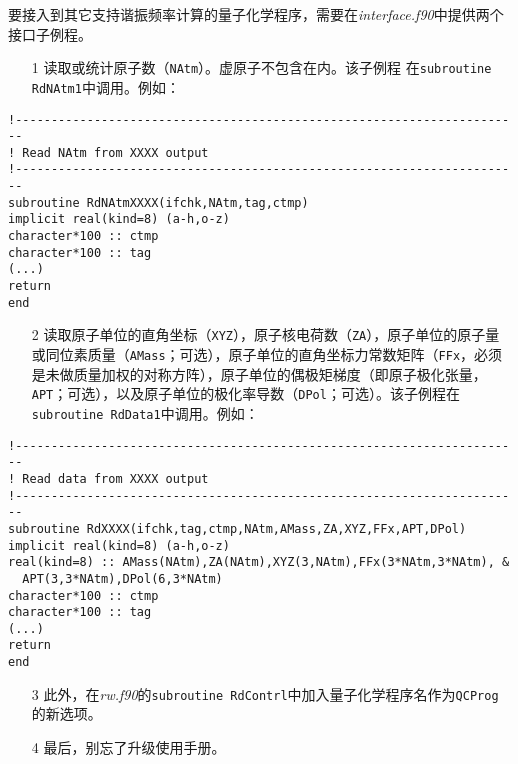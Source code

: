 \documentclass[12pt,a4paper,openany,twoside,cap,UTF8]{ctexbook}
\begin{document}
要接入到其它支持谐振频率计算的量子化学程序，需要在\emph{interface.f90}中提供两个接口子例程。
\begin{enumerate}
\item[1] 读取或统计原子数（\verb|NAtm|）。虚原子不包含在内。该子例程 在\verb|subroutine RdNAtm1|中调用。例如：
\end{enumerate}
\begin{colorboxed}[oval=false,boxcolor=blue!75!black,bgcolor=blue!5!white]
\begin{lstlisting}[language={[90]Fortran}]
!-----------------------------------------------------------------------
! Read NAtm from XXXX output
!-----------------------------------------------------------------------
subroutine RdNAtmXXXX(ifchk,NAtm,tag,ctmp)
implicit real(kind=8) (a-h,o-z)
character*100 :: ctmp
character*100 :: tag
(...)
return
end
\end{lstlisting}\end{colorboxed}
\begin{enumerate}
\item[2] 读取原子单位的直角坐标（\verb|XYZ|），原子核电荷数（\verb|ZA|），原子单位的原子量或同位素质量（\verb|AMass|；可选），原子单位的直角坐标力常数矩阵（\verb|FFx|，必须是未做质量加权的对称方阵），原子单位的偶极矩梯度（即原子极化张量，\verb|APT|；可选），以及原子单位的极化率导数（\verb|DPol|；可选）。该子例程在\verb|subroutine RdData1|中调用。例如：
\end{enumerate}
\begin{colorboxed}[oval=false,boxcolor=blue!75!black,bgcolor=blue!5!white]
\begin{lstlisting}[language={[90]Fortran}]
!-----------------------------------------------------------------------
! Read data from XXXX output
!-----------------------------------------------------------------------
subroutine RdXXXX(ifchk,tag,ctmp,NAtm,AMass,ZA,XYZ,FFx,APT,DPol)
implicit real(kind=8) (a-h,o-z)
real(kind=8) :: AMass(NAtm),ZA(NAtm),XYZ(3,NAtm),FFx(3*NAtm,3*NAtm), &
  APT(3,3*NAtm),DPol(6,3*NAtm)
character*100 :: ctmp
character*100 :: tag
(...)
return
end
\end{lstlisting}\end{colorboxed}
\begin{enumerate}
\item[3] 此外，在\emph{rw.f90}的\verb|subroutine RdContrl|中加入量子化学程序名作为\verb|QCProg|的新选项。

\item[4] 最后，别忘了升级使用手册。
\end{enumerate}
\end{document}
